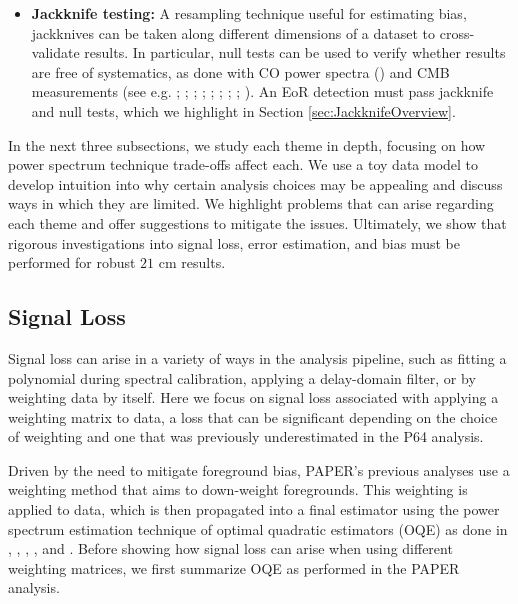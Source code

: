 \documentclass[preprint2,numberedappendix,tighten]{aastex6}  %
\begin{document}
\begin{itemize}
\item \textbf{Jackknife testing:} A resampling technique useful for estimating bias, jackknives can be taken along different 
dimensions of a dataset to cross-validate results. In particular, null tests can be used to verify whether results are free of 
systematics, as done with CO power spectra (\citealt{keating_et_al2016}) and CMB measurements (see e.g. \citealt{ade_et_al2008}; \citealt{chiang_et_al2010}; \citealt{bischoff_et_al2011}; \citealt{das_et_al2011}; \citealt{araujo_et_al2012}; \citealt{crites_et_al2015}; \citealt{ade_et_al2016}; \citealt{ade_et_al2017}; \citealt{sherwin_et_al2017}). An EoR detection must pass jackknife and null tests, which we highlight in Section \ref{sec:JackknifeOverview}.
\end{itemize}

In the next three subsections, we study each theme in depth, focusing on how power spectrum technique trade-offs affect each. 
We use a toy data model to develop intuition into why certain analysis choices may be appealing and discuss ways in which 
they are limited. We highlight problems that can arise regarding each theme and offer suggestions to mitigate the issues. 
Ultimately, we show that rigorous investigations into signal loss, error estimation, and bias must be performed for robust $21$ 
cm results.


\subsection{Signal Loss}
\label{sec:SiglossOverview}

Signal loss can arise in a variety of ways in the analysis pipeline, such as fitting a polynomial during 
spectral calibration, applying a delay-domain filter, or by weighting data by itself. Here we focus on signal loss associated with 
applying a weighting matrix to data, a loss that can be significant depending on the choice of weighting and one that was 
previously underestimated in the P64 analysis.

Driven by the need to mitigate foreground bias, PAPER's previous analyses use a weighting method that aims to down-weight 
foregrounds. This weighting is applied to data, which is then propagated into a final estimator using the power spectrum 
estimation technique of optimal quadratic estimators (OQE) as done in \citet{liu_tegmark2011}, \citet{dillon_et_al2013a}, \citet{liu_et_al2014a}, \citet{liu_et_al2014b}, and \citet{trott_et_al2012}. Before showing 
how signal loss can arise when using different weighting matrices, we first summarize OQE as performed in the PAPER 
analysis.
\end{document}
